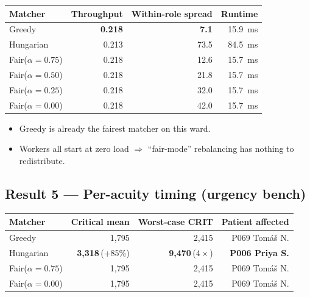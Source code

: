 \begin{table}[H]
\centering
\small
\begin{tabular}{l r r r}
\toprule
\textbf{Matcher} & \textbf{Throughput} & \textbf{Within-role spread}
                 & \textbf{Runtime} \\
\midrule
Greedy             & \textbf{0.218} & \textbf{7.1}  & 15.9~ms \\
Hungarian          & 0.213          & 73.5          & 84.5~ms \\
Fair($\alpha=0.75$) & 0.218         & 12.6          & 15.7~ms \\
Fair($\alpha=0.50$) & 0.218         & 21.8          & 15.7~ms \\
Fair($\alpha=0.25$) & 0.218         & 32.0          & 15.7~ms \\
Fair($\alpha=0.00$) & 0.218         & 42.0          & 15.7~ms \\
\bottomrule
\end{tabular}
\end{table}

\begin{itemize}
  \item Greedy is already the fairest matcher on this ward.
  \item Workers all start at zero load $\Rightarrow$ ``fair-mode''
        rebalancing has nothing to redistribute.
\end{itemize}

\subsection{Result 5 --- Per-acuity timing (urgency bench)}

\begin{table}[H]
\centering
\small
\begin{tabular}{l r r r}
\toprule
\textbf{Matcher} & \textbf{Critical mean} &
\textbf{Worst-case CRIT} & \textbf{Patient affected} \\
\midrule
Greedy           & 1{,}795 & 2{,}415 & P069 Tom\'a\v{s} N. \\
Hungarian        & \textbf{3{,}318}\,(+85\%) & \textbf{9{,}470}\,($4\times$)
                 & \textbf{P006 Priya S.} \\
Fair($\alpha\!=\!0.75$) & 1{,}795 & 2{,}415 & P069 Tom\'a\v{s} N. \\
Fair($\alpha\!=\!0.00$) & 1{,}795 & 2{,}415 & P069 Tom\'a\v{s} N. \\
\bottomrule
\end{tabular}
\end{table}

